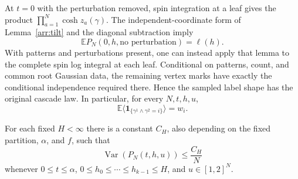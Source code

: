 At $t=0$ with the perturbation removed, spin integration at a
leaf gives the product $\prod_{a=1}^N\cosh z_a(\gamma)$.
The independent-coordinate form of Lemma~\ref{arr:tilt} and
the diagonal subtraction imply
\begin{equation}
\label{upper:initial-value}
 \mathbb E P_N(0,h,\text{no perturbation})=\ell(h).
\end{equation}
With patterns and perturbations present, one can instead apply
that lemma to the complete spin log integral at each leaf.
Conditional on patterns, count, and common root Gaussian data,
the remaining vertex marks have exactly the conditional
independence required there. Hence the sampled label shape has
the original cascade law. In particular, for every $N,t,h,u$,
\begin{equation}
\label{upper:label-law}
 \mathbb E\langle\mathbf 1_{
        \{\gamma^1\wedge\gamma^2=i\}}\rangle=w_i.
\end{equation}

\begin{lemma}
\label{upper:concentration}
For each fixed $H<\infty$ there is a constant $C_H$, also
depending on the fixed partition, $\alpha$, and $f$, such that
\begin{equation}
\label{upper:variance}
 \operatorname{Var}(P_N(t,h,u))\le\frac{C_H}{N}
\end{equation}
whenever $0\le t\le\alpha$, $0\le h_0\le\cdots\le
h_{k-1}\le H$, and $u\in[1,2]^N$.
\end{lemma}

